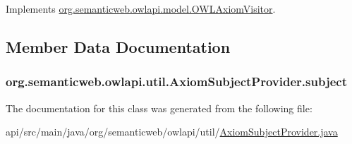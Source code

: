 Implements \hyperlink{interfaceorg_1_1semanticweb_1_1owlapi_1_1model_1_1_o_w_l_axiom_visitor_aaaa73f4e22881ab0ff5659c18ce2977c}{org.\-semanticweb.\-owlapi.\-model.\-O\-W\-L\-Axiom\-Visitor}.



\subsection{Member Data Documentation}
\hypertarget{classorg_1_1semanticweb_1_1owlapi_1_1util_1_1_axiom_subject_provider_ace7b9575160492a73701103321f9871b}{
\subsubsection[{subject}]{ org.\-semanticweb.\-owlapi.\-util.\-Axiom\-Subject\-Provider.\-subject\hspace{0.3cm}{\ttfamily [private]}}}\label{classorg_1_1semanticweb_1_1owlapi_1_1util_1_1_axiom_subject_provider_ace7b9575160492a73701103321f9871b}


The documentation for this class was generated from the following file\-:\begin{DoxyCompactItemize}
\item 
api/src/main/java/org/semanticweb/owlapi/util/\hyperlink{_axiom_subject_provider_8java}{Axiom\-Subject\-Provider.\-java}\end{DoxyCompactItemize}
